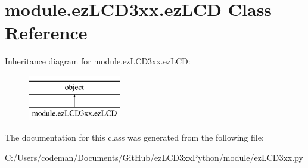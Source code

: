 \hypertarget{classmodule_1_1ez_l_c_d3xx_1_1ez_l_c_d}{\section{module.\-ez\-L\-C\-D3xx.\-ez\-L\-C\-D Class Reference}
\label{classmodule_1_1ez_l_c_d3xx_1_1ez_l_c_d}
}
Inheritance diagram for module.\-ez\-L\-C\-D3xx.\-ez\-L\-C\-D\-:\begin{figure}[H]
\begin{center}
\leavevmode
\includegraphics[height=2.000000cm]{d0/dec/classmodule_1_1ez_l_c_d3xx_1_1ez_l_c_d}
\end{center}
\end{figure}


The documentation for this class was generated from the following file\-:\begin{DoxyCompactItemize}
\item 
C\-:/\-Users/codeman/\-Documents/\-Git\-Hub/ez\-L\-C\-D3xx\-Python/module/ez\-L\-C\-D3xx.\-py\end{DoxyCompactItemize}
